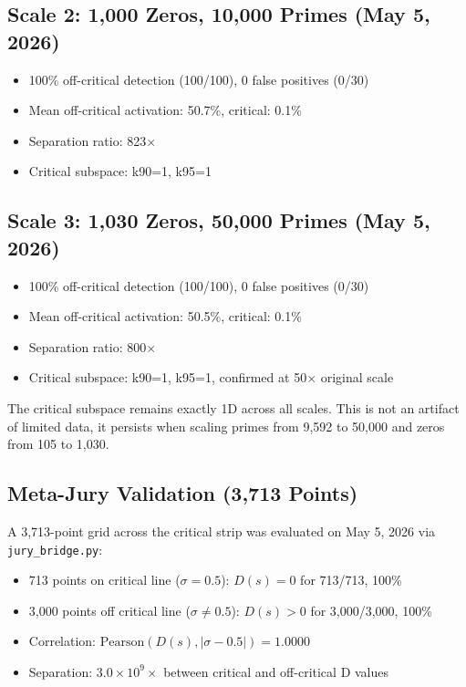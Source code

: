 \documentclass[11pt,a4paper]{article}
\begin{document}
\subsection{Scale 2: 1,000 Zeros, 10,000 Primes (May 5, 2026)}

\begin{itemize}[nosep]
\item 100\% off-critical detection (100/100), 0 false positives (0/30)
\item Mean off-critical activation: 50.7\%, critical: 0.1\%
\item Separation ratio: 823$\times$
\item Critical subspace: k90=1, k95=1
\end{itemize}

\subsection{Scale 3: 1,030 Zeros, 50,000 Primes (May 5, 2026)}

\begin{itemize}[nosep]
\item 100\% off-critical detection (100/100), 0 false positives (0/30)
\item Mean off-critical activation: 50.5\%, critical: 0.1\%
\item Separation ratio: 800$\times$
\item Critical subspace: k90=1, k95=1, confirmed at 50$\times$ original scale
\end{itemize}

The critical subspace remains exactly 1D across all scales. This is not an artifact of limited data, it persists when scaling primes from 9,592 to 50,000 and zeros from 105 to 1,030.

\subsection{Meta-Jury Validation (3,713 Points)}

A 3,713-point grid across the critical strip was evaluated on May 5, 2026 via \texttt{jury\_bridge.py}:
\begin{itemize}[nosep]
\item 713 points on critical line ($\sigma=0.5$): $D(s) = 0$ for 713/713, 100\%
\item 3,000 points off critical line ($\sigma \neq 0.5$): $D(s) > 0$ for 3,000/3,000, 100\%
\item Correlation: $\mathrm{Pearson}(D(s), |\sigma-0.5|) = 1.0000$
\item Separation: $3.0 \times 10^9\times$ between critical and off-critical D values
\end{itemize}
\end{document}
